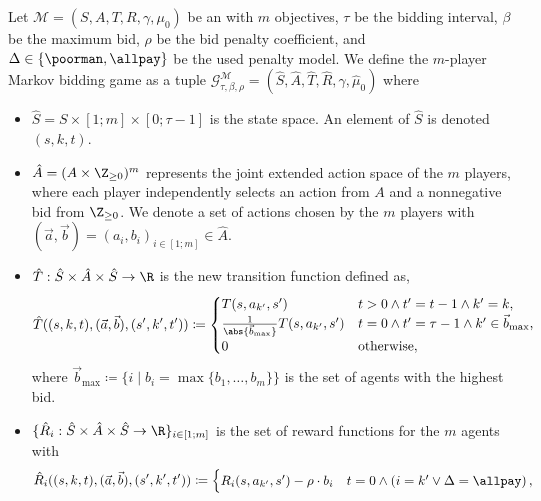 \begin{definition}\label{def:markov game}
    Let \(\mathcal{M} = (S, A, T, R, \gamma, \mu_0)\) be an \momdp with \(m\) objectives, $\tau$ be the bidding interval, $\beta$ be the maximum bid, $\rho$ be the bid penalty coefficient, and $\Delta\in \{ \poorman,\allpay\}$ be the used penalty model.
    We define the \(m\)-player Markov bidding game as a tuple \(\mathcal{G}^{\mathcal{M}}_{\tau,\beta,\rho} = (\hat S, \hat{A}, \hat{T}, \hat{R}, \gamma, \hat \mu_0)\) where
    \begin{itemize}
        \item \(\hat S = S \times [1;m] \times [0;\tau - 1]\) is the state space. An element of \(\hat S\) is denoted \((s, k, t)\).
        \item \(\hat{A} = (A \times \Z_{\geq 0})^m\) represents the joint extended action space of the \(m\) players, where each player independently selects an action from \(A\) and a nonnegative bid from $\Z_{\geq 0}$. We denote a set of actions chosen by the \(m\) players with \((\vec a, \vec b) = (a_i, b_i)_{i \in [1;m]} \in \hat{A}\).
        \item \(\hat{T} : \hat S \times \hat{A} \times \hat S \to \R\) is the new transition function defined as,
        \begin{equation*}
            \hat T((s, k, t), (\vec a, \vec b), (s', k', t')) \coloneqq 
            \begin{cases}
                T(s, a_{k'}, s') & t >0\land t' = t-1 \land k'=k,  \\
                \frac{1}{\abs{\vec{b}_{\max}}} T(s, a_{k'}, s') & t = 0 \wedge t' = \tau-1 \wedge k' \in \vec{b}_{\max}, \\
                0 & \text{otherwise},
            \end{cases}
        \end{equation*}
        where \(\vec b_{\max} \coloneqq \{i \mid b_i = \max \{b_1, \dots, b_m\}\}\) is the set of agents with the highest bid.
        \item \(\{\hat{R}_i : \hat S \times \hat{A} \times \hat S \to \R\}_{i \in [1; m]}\) is the set of reward functions for the \(m\) agents with
        \begin{equation*}
            \hat{R}_i((s, k, t), (\vec a, \vec b), (s', k', t')) \coloneqq 
            \begin{cases}
                R_i(s, a_{k'}, s') - \rho \cdot b_{i} & t = 0 \land \left( i = k' \lor \Delta = \allpay \right),\\

\end{cases}
\end{equation*}
\end{itemize}
\end{definition}
